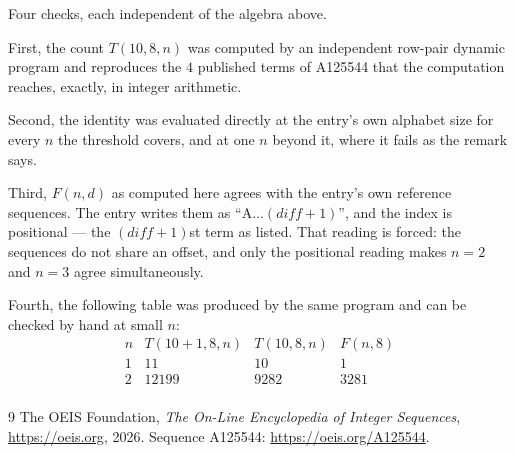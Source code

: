 \documentclass[11pt,a4paper]{article}
\theoremstyle{plain}
\theoremstyle{definition}
\begin{document}
Four checks, each independent of the algebra above.

First, the count $T(10,8,n)$ was computed by an independent row-pair dynamic program and
reproduces the $4$ published terms of A125544 that the computation reaches,
exactly, in integer arithmetic.

Second, the identity was evaluated directly at the entry's own alphabet size for every $n$ the
threshold covers, and at one $n$ beyond it, where it fails as the remark says.

Third, $F(n,d)$ as computed here agrees with the entry's own reference sequences. The entry
writes them as ``$\mathrm{A}\dots(\mathit{diff}+1)$'', and the index is positional --- the
$(\mathit{diff}+1)$st term as listed. That reading is forced: the sequences do not share an
offset, and only the positional reading makes $n=2$ and $n=3$ agree simultaneously.

Fourth, the following table was produced by the same program and can be checked by hand at
small $n$:
\[
\begin{array}{rrrr}
n & T(10+1,8,n) & T(10,8,n) & F(n,8) \\ \hline
1 & 11 & 10 & 1 \\
2 & 12199 & 9282 & 3281 \\
\end{array}
\]

\begin{thebibliography}{9}
 The OEIS Foundation, \emph{The On-Line Encyclopedia of Integer Sequences},
\url{https://oeis.org}, 2026. Sequence A125544: \url{https://oeis.org/A125544}.
\end{thebibliography}
\end{document}
